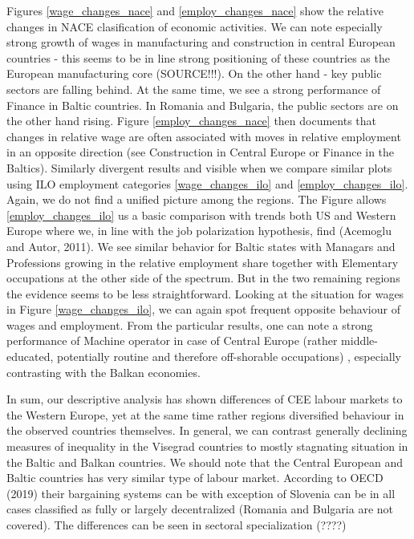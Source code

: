 \documentclass{article}
\begin{document}
Figures \ref{wage_changes_nace} and \ref{employ_changes_nace} show the relative changes in NACE clasification of economic activities. We can note especially strong growth of wages in manufacturing and construction in central European countries  - this seems to be in line strong positioning of these countries as the European manufacturing core (SOURCE!!!). On the other hand - key public sectors are falling behind. At the same time, we see a strong performance of Finance in Baltic countries. In Romania and Bulgaria, the public sectors are on the other hand rising. Figure \ref{employ_changes_nace} then documents that changes in relative wage are often associated with moves in relative employment in an opposite direction (see Construction in Central Europe or Finance in the Baltics). %
Similarly divergent results and visible when we compare similar plots using ILO employment categories \ref{wage_changes_ilo} and \ref{employ_changes_ilo}. Again, we do not find a unified picture among the regions. The Figure allows \ref{employ_changes_ilo} us a basic comparison with trends both US and Western Europe where we, in line with the job polarization hypothesis, find  (Acemoglu and Autor, 2011). We see similar behavior for Baltic states with Managars and Professions growing in the relative employment share together with Elementary occupations at the other side of the spectrum. But in the two remaining regions the evidence seems to be less straightforward. Looking at the situation for wages in Figure \ref{wage_changes_ilo}, we can again spot frequent opposite behaviour of wages and employment. From the particular results, one can note a strong performance of Machine operator in case of Central Europe (rather middle-educated, potentially routine and therefore off-shorable occupations) , especially contrasting with the Balkan economies.

In sum, our descriptive analysis has shown differences of CEE labour markets to the Western Europe, yet at the same time rather regions diversified behaviour in the observed countries themselves. %
In general, we can contrast generally declining measures of inequality in the Visegrad countries to mostly stagnating situation in the Baltic and Balkan countries. %
We should note that the Central European and Baltic countries has very similar type of labour market. According to OECD (2019) their bargaining systems can be with exception of Slovenia can be in all cases classified as fully or largely decentralized (Romania and Bulgaria are not covered).
The differences can be seen in sectoral specialization (????)
\end{document}
